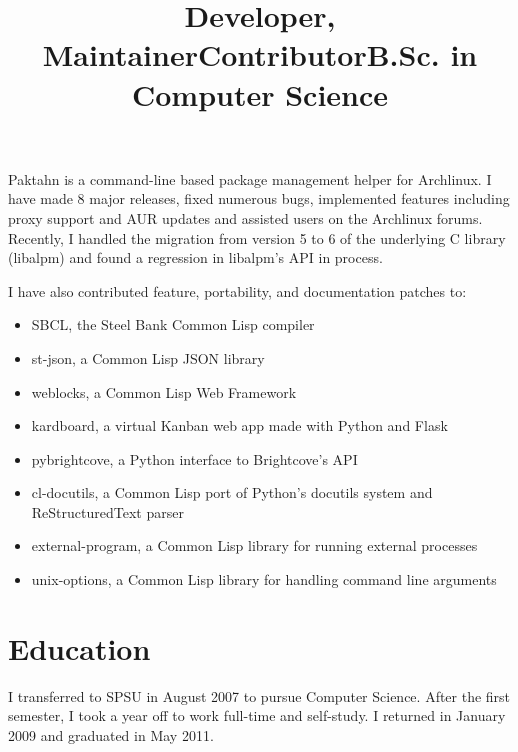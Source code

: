 \documentclass[margintitle,line]{res}
\begin{document}
\begin{resume}
\title{Developer, Maintainer}
\begin{position}
  Paktahn is a command-line based package management helper for Archlinux.
  I have made 8 major releases, fixed numerous bugs, implemented features
  including proxy support and AUR updates and assisted users on the Archlinux
  forums. Recently, I handled the migration from version 5 to 6 of the
  underlying C library (libalpm) and found a regression in libalpm's API in
  process.
\end{position}

\title{Contributor}
\begin{position}
  I have also contributed feature, portability, and documentation patches to:
  \begin{itemize}
    \item{SBCL, the Steel Bank Common Lisp compiler}
    \item{st-json, a Common Lisp JSON library}
    \item{weblocks, a Common Lisp Web Framework}
    \item{kardboard, a virtual Kanban web app made with Python and Flask}
    \item{pybrightcove, a Python interface to Brightcove's API}
    \item{cl-docutils, a Common Lisp port of Python's docutils system and ReStructuredText parser}
    \item{external-program, a Common Lisp library for running external processes}
    \item{unix-options, a Common Lisp library for handling command line arguments}
  \end{itemize}
\end{position}


\section{Education}

\title{B.Sc. in Computer Science}
\begin{position}
  I transferred to SPSU in August 2007 to pursue Computer Science.
  After the first semester, I took a year off to work full-time and self-study.
  I returned in January 2009 and graduated in May 2011.
\end{position}


\end{resume}
\end{document}
